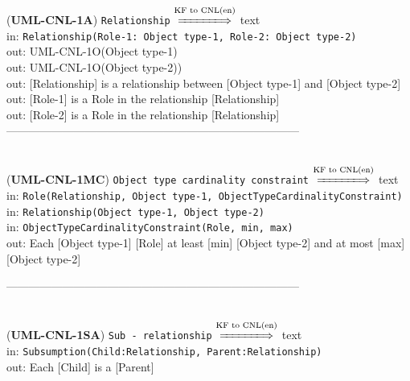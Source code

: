 \documentclass[sn-mathphys]{sn-jnl}
\begin{document}
{{{{{{({\bf UML-CNL-1A}) {\tt Relationship} $\overset{\text{KF to CNL(en)}}{\xLongrightarrow{\hspace*{1.4cm}}}$ {text}\\
\hspace*{0.3cm}in: {\tt Relationship(Role-1: Object type-1, Role-2: Object type-2)} \\
\hspace*{0.5cm}out:  UML-CNL-1O(Object type-1)\\ 
\hspace*{0.5cm}out:  UML-CNL-1O(Object type-2))}\\
\hspace*{0.5cm}out:  [Relationship] is a relationship between [Object type-1] and [Object type-2]\\
\hspace*{0.5cm}out:  [Role-1] is a Role in the relationship [Relationship]\\
\hspace*{0.5cm}out:  [Role-2] is a Role in the relationship [Relationship]\\

------------------------------------------------------------------------------
\\ \

({\bf UML-CNL-1MC}) {\tt Object type cardinality constraint} $\overset{\text{KF to CNL(en)}}{\xLongrightarrow{\hspace*{1.4cm}}}$ {text}\\
\hspace*{0.3cm}in: {\tt Role(Relationship, Object type-1, ObjectTypeCardinalityConstraint)}\\
\hspace*{0.3cm}in: {\tt Relationship(Object type-1, Object type-2)} \\
\hspace*{0.3cm}in: {\tt ObjectTypeCardinalityConstraint(Role, min, max)} \\
\hspace*{0.5cm}out:  Each [Object type-1] [Role] at least [min] [Object type-2] and at most [max] [Object type-2] 

------------------------------------------------------------------------------
\\ \


({\bf UML-CNL-1SA}) {\tt Sub - relationship} $\overset{\text{KF to CNL(en)}}{\xLongrightarrow{\hspace*{1.4cm}}}$ {text}\\
\hspace*{0.3cm}in: {\tt Subsumption(Child:Relationship, Parent:Relationship)} \\
\hspace*{0.5cm}out: Each [Child] is a [Parent]

}}}}}
\end{document}
